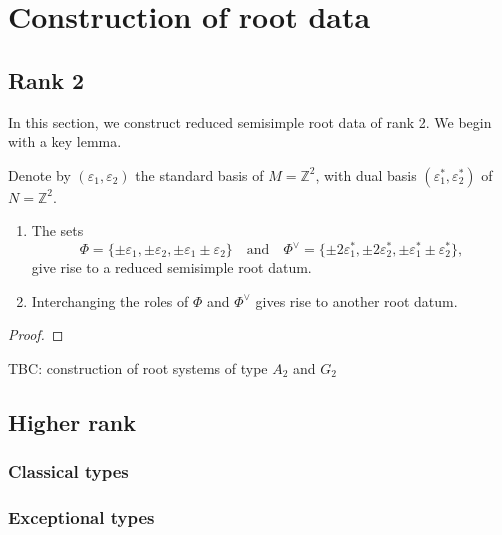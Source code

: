 \chapter{Construction of root data}
\label{cha:construction-root-systems}
\section{Rank 2}
In this section, we construct reduced semisimple root data of rank 2. We begin with a 
key lemma. 

\begin{lemma}

\end{lemma}





Denote by $(\varepsilon_1, \varepsilon_2)$ the standard basis 
of $M = \mathbb{Z}^2$, 
with dual basis $(\varepsilon_1^*, \varepsilon_2^*)$ of $N = \mathbb{Z}^2$.\\

\begin{lemma}
    \label{rank2:construct}
    \begin{enumerate}
        \item The sets 
\[
    \Phi = \{\pm \varepsilon_1, \pm \varepsilon_2, \pm\varepsilon_1\pm\varepsilon_2\} \quad \text{and} \quad
    \Phi^\vee = \{\pm 2\varepsilon^*_1, \pm 2 \varepsilon^*_2, \pm \varepsilon_1^* \pm \varepsilon_2^* \},
\]
give rise to a reduced semisimple root datum.
        \item Interchanging the roles of $\Phi$ and $\Phi^\vee$ gives rise to another root datum.
    \end{enumerate}
\end{lemma}
\begin{proof}

\end{proof}


\begin{lemma}
    TBC: construction of root systems of type $A_2$ and $G_2$
\end{lemma}

\section{Higher rank}
\label{sec:higher-rank}
\subsection{Classical types}
\label{subsec:classical-types}
\subsection{Exceptional types}